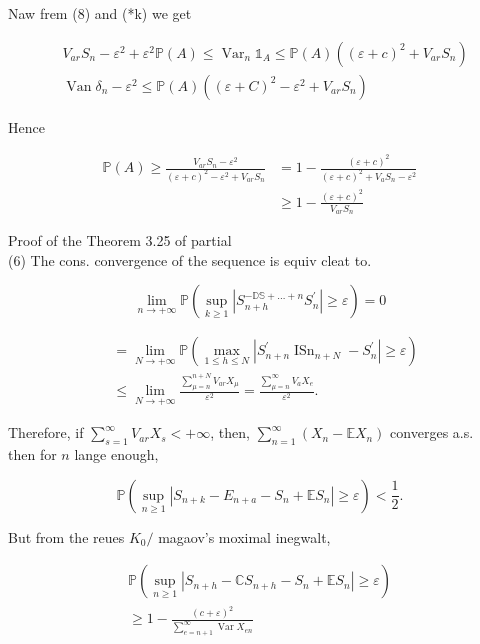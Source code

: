 \documentclass{amsbook}
\theoremstyle{plain}%
\theoremstyle{definition}
\theoremstyle{remark}
\begin{document}
Naw frem (8) and (*k) we get

$$
\begin{aligned}
& V_{a r} S_{n}-\varepsilon^{2}+\varepsilon^{2} \mathbb{P}(A) \leq \operatorname{Var}_{n} \mathbb{1}_{A} \leq \mathbb{P}(A)\left((\varepsilon+c)^{2}+V_{a r} S_{n}\right) \\
& \operatorname{Van} \delta_{n}-\varepsilon^{2} \leq \mathbb{P}(A)\left((\varepsilon+C)^{2}-\varepsilon^{2}+V_{a r} S_{n}\right)
\end{aligned}
$$

Hence

$$
\begin{aligned}
\mathbb{P}(A) \geqslant \frac{V_{a r} S_{n}-\varepsilon^{2}}{(\varepsilon+c)^{2}-\varepsilon^{2}+V_{a r} S_{n}} & =1-\frac{(\varepsilon+c)^{2}}{(\varepsilon+c)^{2}+V_{a} S_{n}-\varepsilon^{2}} \\
& \geqslant 1-\frac{(\varepsilon+c)^{2}}{V_{a r} S_{n}}
\end{aligned}
$$

Proof of the Theorem 3.25 of partial\\
(6) The cons. convergence of the sequence is equiv cleat to.

$$
\lim _{n \rightarrow+\infty} \mathbb{P}\left(\sup _{k \geqslant 1}\left|S_{n+h}^{-\mathbb{D S}+\ldots+n} S_{n}^{\prime}\right| \geqslant \varepsilon\right)=0
$$

$$
\begin{aligned}
& =\lim _{N \rightarrow+\infty} \mathbb{P}\left(\max _{1 \leq h \leq N}\left|S_{n+n}^{\prime} \operatorname{ISn}_{n+N}-S_{n}^{\prime}\right| \geqslant \varepsilon\right) \\
& \leq \lim _{N \rightarrow+\infty} \frac{\sum_{\mu=n}^{n+N} V_{a r} X_{\mu}}{\varepsilon^{2}}=\frac{\sum_{\mu=n}^{\infty} V_{a} X_{e}}{\varepsilon^{2}} \text {. }
\end{aligned}
$$

Therefore, if $\sum_{s=1}^{\infty} V_{a r} X_{s}<+\infty$, then, $\sum_{n=1}^{\infty}\left(X_{n}-\mathbb{E} X_{n}\right)$ converges a.s.\\
then for $n$ lange enough,

$$
\mathbb{P}\left(\sup _{n \geqslant 1}\left|S_{n+k}-E_{n+a}-S_{n}+\mathbb{E} S_{n}\right| \geqslant \varepsilon\right)<\frac{1}{2} .
$$

But from the reues $K_{0} /$ magaov's moximal inegwalt,

$$
\begin{gathered}
\mathbb{P}\left(\sup _{n \geqslant 1}\left|S_{n+h}-\mathbb{C} S_{n+h}-S_{n}+\mathbb{E} S_{n}\right| \geqslant \varepsilon\right) \\
\geqslant 1-\frac{(c+\varepsilon)^{2}}{\sum_{e=n+1}^{\infty} \operatorname{Var} X_{e n}}
\end{gathered}
$$
\end{document}

